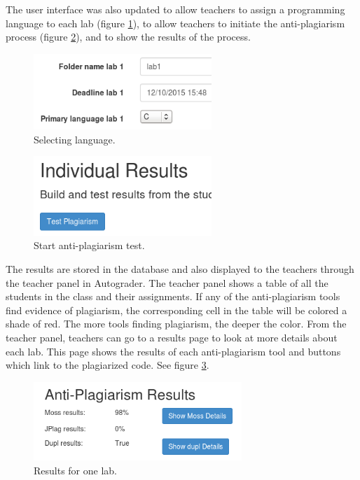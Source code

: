 \documentclass[10pt,journal,compsoc]{IEEEtran}
\begin{document}
		The user interface was also updated to allow teachers to assign a programming language to each lab (figure \ref{fig:selectLang}), to allow teachers to initiate the anti-plagiarism process (figure \ref{fig:startTest}), and to show the results of the process. 
		
		\begin{figure}[h!]
			\includegraphics[width=0.6\textwidth]{SelectingLanguage.png}
			\caption{Selecting language.}
			\label{fig:selectLang}
		\end{figure}
		
		\begin{figure}[h!]
			\includegraphics[width=0.6\textwidth]{StartTest.png}
			\caption{Start anti-plagiarism test.}
			\label{fig:startTest}
		\end{figure}
		
		The results are stored in the database and also displayed to the teachers through the teacher panel in Autograder. The teacher panel shows a table of all the students in the class and their assignments. If any of the anti-plagiarism tools find evidence of plagiarism, the corresponding cell in the table will be colored a shade of red. The more tools finding plagiarism, the deeper the color. From the teacher panel, teachers can go to a results page to look at more details about each lab. This page shows the results of each anti-plagiarism tool and buttons which link to the plagiarized code. See figure \ref{fig:labresults}.
		
		\begin{figure}[h!]
			\includegraphics[width=0.7\textwidth]{LabResults.png}
			\caption{Results for one lab.}
			\label{fig:labresults}
		\end{figure}
		
\end{document}
